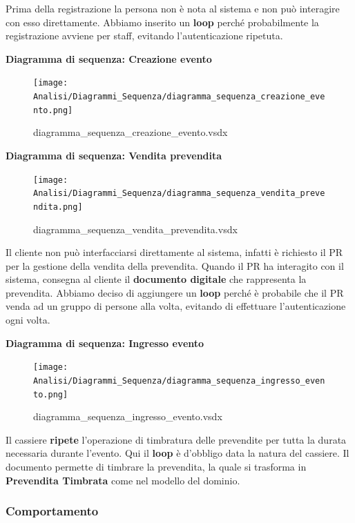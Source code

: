 \documentclass[a4paper]{article}
\begin{document}
Prima della registrazione la persona non è nota al sistema e non può interagire con esso direttamente. Abbiamo inserito un \textbf{loop} perché probabilmente la registrazione avviene per staff, evitando l'autenticazione ripetuta.

\newpage

\textbf{Diagramma di sequenza: Creazione evento}

\begin{figure}[H]
    \texttt{[image: Analisi/Diagrammi\_Sequenza/diagramma\_sequenza\_creazione\_evento.png]}
    \centering
    \caption{diagramma\_sequenza\_creazione\_evento.vsdx}
\end{figure}

\textbf{Diagramma di sequenza: Vendita prevendita}

\begin{figure}[H]
    \texttt{[image: Analisi/Diagrammi\_Sequenza/diagramma\_sequenza\_vendita\_prevendita.png]}
    \centering
    \caption{diagramma\_sequenza\_vendita\_prevendita.vsdx}
\end{figure}

Il cliente non può interfacciarsi direttamente al sistema, infatti è richiesto il PR per la gestione della vendita della prevendita. Quando il PR ha interagito con il sistema, consegna al cliente il \textbf{documento digitale} che rappresenta la prevendita. Abbiamo deciso di aggiungere un \textbf{loop} perché è probabile che il PR venda ad un gruppo di persone alla volta, evitando di effettuare l'autenticazione ogni volta.

\newpage

\textbf{Diagramma di sequenza: Ingresso evento}

\begin{figure}[H]
    \texttt{[image: Analisi/Diagrammi\_Sequenza/diagramma\_sequenza\_ingresso\_evento.png]}
    \centering
    \caption{diagramma\_sequenza\_ingresso\_evento.vsdx}
\end{figure}

Il cassiere \textbf{ripete} l'operazione di timbratura delle prevendite per tutta la durata necessaria durante l'evento. Qui il \textbf{loop} è d'obbligo data la natura del cassiere. Il documento permette di timbrare la prevendita, la quale si trasforma in \textbf{Prevendita Timbrata} come nel modello del dominio.

\newpage

\subsubsection{Comportamento}
\end{document}
